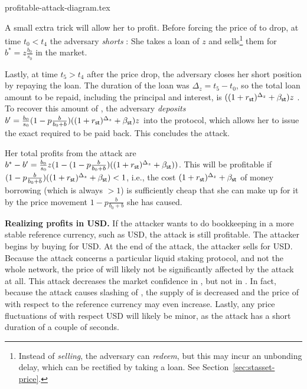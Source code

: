{profitable-attack-diagram.tex}

A small extra trick will allow her to profit.
Before forcing the price of \stasset to drop, at time $t_0 < t_4$
the adversary \emph{shorts}
\stasset: She takes a loan of $z$ \stassets and
sells\footnote{Instead of \emph{selling}, the adversary can \emph{redeem}, but
this may incur an unbonding delay, which can be rectified by taking a loan.
See Section~\ref{sec:stasset-price}.}
them for $b^* = z \frac{b_0}{s_0}$ \asset in the market.

Lastly, at time $t_5 > t_4$ after the price drop, the adversary closes her short position by repaying the
\stasset loan. The duration of the loan was $\Delta_z = t_5 - t_0$, so the
total loan amount to be repaid, including the principal and interest, is
$((1 + r_{\textsf{st}})^{\Delta_z} + \beta_{\textsf{st}}) z$ \stasset.
To recover this amount of \stasset, the adversary \emph{deposits}
$b' = \frac{b_0}{s_0}(1 - p\frac{b}{b_0 + b}) ((1 + r_{\textsf{st}})^{\Delta_z} + \beta_{\textsf{st}}) z$ \asset
into the protocol, which allows her to issue the exact required \stasset
to be paid back. This concludes the attack.

Her total profits from the attack are
$b^* - b' = \frac{b_0}{s_0}z(1 - (1 - p\frac{b}{b_0 + b})((1 + r_{\textsf{st}})^{\Delta_z} + \beta_{\textsf{st}}))$.
This will be profitable if $(1 - p\frac{b}{b_0 + b})((1 + r_{\textsf{st}})^{\Delta_z} + \beta_{\textsf{st}}) < 1$,
i.e., the cost $(1 + r_{\textsf{st}})^{\Delta_z} + \beta_{\textsf{st}}$ of money borrowing (which is always $> 1$) is
sufficiently cheap that she can make up for it by the price movement
$1 - p\frac{b}{b_0 + b}$ she has caused.

\noindent
\textbf{Realizing profits in USD.}
If the attacker wants to do bookkeeping in a more stable reference currency,
such as USD, the attack is still profitable. The attacker begins by buying
\asset for USD. At the end of the attack, the attacker sells \asset for USD.
Because the attack concerns a particular liquid staking protocol, and
not the whole \asset network, the price of \asset will likely not
be significantly affected by the attack at all.
This attack decreases the market confidence in \stasset,
but not in \asset.
In fact, because
the attack causes slashing of \asset, the supply of \asset is decreased
and the price of \asset with respect to the reference currency may
even increase.
Lastly, any price fluctuations of \asset with respect USD will likely be
minor, as the attack has a short duration of a couple of seconds.

